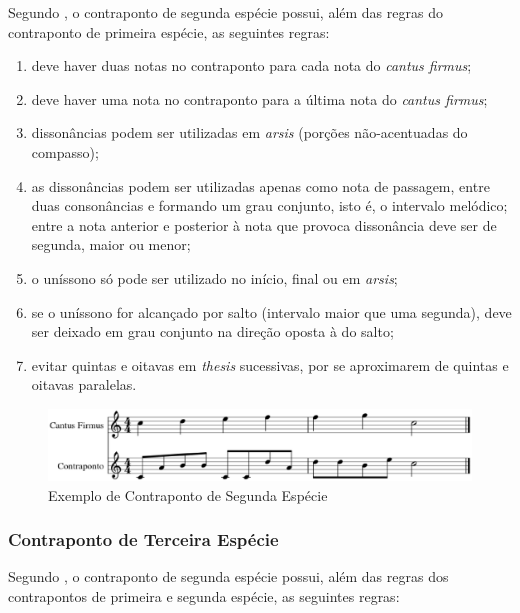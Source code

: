         Segundo , o contraponto de segunda espécie possui, além das regras do contraponto de primeira espécie, as seguintes regras:

        \begin{enumerate}
          \item deve haver duas notas no contraponto para cada nota do \textit{cantus firmus};
          \item deve haver uma nota no contraponto para a última nota do \textit{cantus firmus};
          \item dissonâncias podem ser utilizadas em \textit{arsis} (porções não-acentuadas do compasso);
          \item as dissonâncias podem ser utilizadas apenas como nota de passagem, entre duas consonâncias e formando um grau conjunto, isto é, o intervalo melódico; entre a nota anterior e posterior à nota que provoca dissonância deve ser de segunda, maior ou menor;
          \item o uníssono só pode ser utilizado no início, final ou em \textit{arsis};
          \item se o uníssono for alcançado por salto (intervalo maior que uma segunda), deve ser deixado em grau conjunto na direção oposta à do salto;
          \item evitar quintas e oitavas em \textit{thesis} sucessivas, por se aproximarem de quintas e oitavas paralelas.
        \end{enumerate}

        \begin{figure}[htb]
          \centering
          \includegraphics[scale=0.55]{figuras/contrapontosegunda.eps}
          \caption{Exemplo de Contraponto de Segunda Espécie}
          \label{contrapontosegunda}
        \end{figure}

      \subsubsection[Contraponto de Terceira Espécie]{Contraponto de Terceira Espécie}

        Segundo , o contraponto de segunda espécie possui, além das regras dos contrapontos de primeira e segunda espécie, as seguintes regras:

